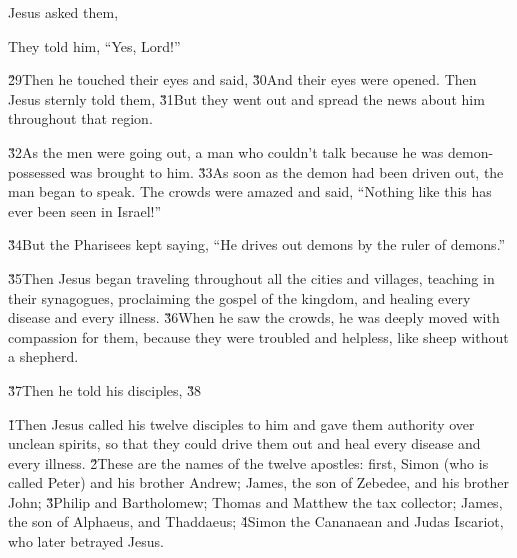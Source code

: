 Jesus asked them, 

They told him, ``Yes, Lord!''

\v{29}Then he touched their eyes and said,  \v{30}And their eyes were opened. Then Jesus sternly told them,  \v{31}But they went out and spread the news about him throughout that region.

\v{32}As the men were going out, a man who couldn't talk because he was demon-possessed was brought to him. \v{33}As soon as the demon had been driven out, the man began to speak. The crowds were amazed and said, ``Nothing like this has ever been seen in Israel!''

\v{34}But the Pharisees kept saying, ``He drives out demons by the ruler of demons.''

\v{35}Then Jesus began traveling throughout all the cities and villages, teaching in their synagogues, proclaiming the gospel of the kingdom, and healing every disease and every illness. \v{36}When he saw the crowds, he was deeply moved with compassion for them, because they were troubled and helpless, like sheep without a shepherd.

\v{37}Then he told his disciples,  \v{38}

\v{1}Then Jesus called his twelve disciples to him and gave them authority over unclean spirits, so that they could drive them out and heal every disease and every illness. \v{2}These are the names of the twelve apostles: first, Simon (who is called Peter) and his brother Andrew; James, the son of Zebedee, and his brother John; \v{3}Philip and Bartholomew; Thomas and Matthew the tax collector; James, the son of Alphaeus, and Thaddaeus; \v{4}Simon the Cananaean and Judas Iscariot, who later betrayed Jesus.

